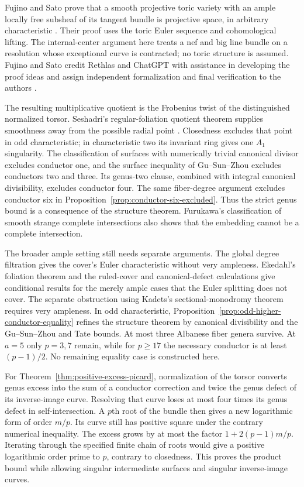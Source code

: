\documentclass[11pt]{article}
\theoremstyle{remark}\newtheorem{remark}[theorem]{Remark}
\begin{document}
Fujino and Sato prove that a smooth projective toric variety with
an ample locally free subsheaf of its tangent bundle is projective
space, in arbitrary characteristic
\cite[Theorem~1.1, p.~1, and proof in \S5, pp.~8--10]{FujinoSatoToric}.
Their proof uses the toric Euler sequence and cohomological lifting.
The internal-center argument here treats a nef and big line bundle
on a resolution whose exceptional curve is contracted; no toric
structure is assumed. Fujino and Sato credit Rethlas and ChatGPT
with assistance in developing the proof ideas and assign independent
formalization and final verification to the authors
\cite[Acknowledgments, p.~3]{FujinoSatoToric}.

The resulting multiplicative quotient is the Frobenius twist of
the distinguished normalized torsor. Seshadri's regular-foliation
quotient theorem supplies smoothness away from the possible radial
point \cite[Proposition~6 and Theorem~2, pp.~6-11--6-16]{SeshadriCartier}.
Closedness excludes that point in odd characteristic; in
characteristic two its invariant ring gives one $A_1$ singularity.
The classification of surfaces with numerically trivial canonical
divisor excludes conductor one, and the surface inequality of
Gu--Sun--Zhou excludes conductors two and three. Its genus-two
clause, combined with integral canonical divisibility, excludes
conductor four. The same fiber-degree argument excludes conductor
six in Proposition~\ref{prop:conductor-six-excluded}. Thus the strict
genus bound is a consequence of the structure theorem.
Furukawa's classification of smooth strange complete intersections
also shows that the embedding cannot be a complete intersection.

The broader ample setting still needs separate arguments.
The global degree filtration gives the cover's Euler characteristic
without very ampleness. Ekedahl's foliation theorem and the ruled-cover and canonical-defect
calculations give conditional results for the merely ample cases
that the Euler splitting does not cover. The separate obstruction
using Kadets's sectional-monodromy theorem requires very ampleness. In odd characteristic,
Proposition~\ref{prop:odd-higher-conductor-equality} refines the
structure theorem by canonical divisibility and the Gu--Sun--Zhou
and Tate bounds. At most three Albanese fiber genera survive.
At $a=5$ only $p=3,7$ remain, while for $p\geq17$ the
necessary conductor is at least $(p-1)/2$.
No remaining equality case is constructed here.

For Theorem~\ref{thm:positive-excess-picard}, normalization of the
torsor converts genus excess into the sum of a conductor correction
and twice the genus defect of its inverse-image curve. Resolving that
curve loses at most four times its genus defect in self-intersection.
A $p$th root of the bundle then gives a new logarithmic form of order
$m/p$. Its curve still has positive square under the contrary numerical
inequality. The excess grows by at most the factor
$1+2(p-1)m/p$. Iterating through the specified finite chain of roots
would give a positive logarithmic order prime to $p$, contrary to
closedness. This proves the product bound while allowing singular
intermediate surfaces and singular inverse-image curves.
\end{document}
